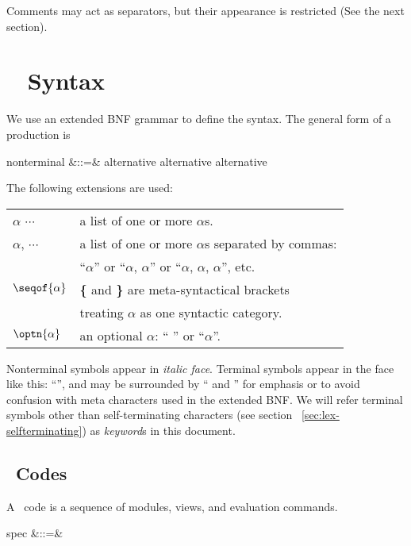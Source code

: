 \documentclass[a4paper]{memoir}
\begin{document}
Comments may act as separators, but their appearance is restricted
(See the next section).

\newpage
\section{\cafeobj~ Syntax} \label{sec:cafeobj-syntax}
We use an extended BNF grammar to define the syntax. The general form
of a production is
\begin{vvtm}
\begin{syntax}
\synindent\synindent  nonterminal &::=& alternative \alt alternative \alt \cdots \alt alternative
\end{syntax}
\end{vvtm}
The following extensions are used:
\begin{center}
\begin{fminipage}{0.7\textwidth}
  \begin{tabular}{ll}
    $\alpha$ $\cdots$ & a list of one or more $\alpha$s. \\
    $\alpha$, $\cdots$ & a list of one or more $\alpha$s separated by commas: \\
    & ``$\alpha$'' or ``$\alpha$, $\alpha$'' or ``$\alpha$, $\alpha$, $\alpha$'', etc. \\
    $\seqof{\alpha}$ & \textbf{\{} and \textbf{\}} are meta-syntactical
    brackets \\ 
    & treating $\alpha$ as one syntactic category. \\
    $\optn{\alpha}$ & an optional $\alpha$: `` '' or ``$\alpha$''.
  \end{tabular}
\end{fminipage}
\end{center}
Nonterminal symbols appear in \textit{italic face}. Terminal symbols
appear in the face like this: ``'', and may be
surrounded by `` and '' for emphasis or to avoid confusion
with meta characters used in the extended BNF. We will refer terminal
symbols other than self-terminating characters (see section
~\ref{sec:lex-selfterminating}) as \textit{keyword}s in this document.

\subsection{\cafeobj~Codes}
A \cafeobj~code is a sequence of modules, views, and evaluation commands.
\begin{vvtm}
\begin{syntax}
  \synindent\synindent spec &::=&  \cdots
\end{syntax}
\end{vvtm}
\newpage
\end{document}
